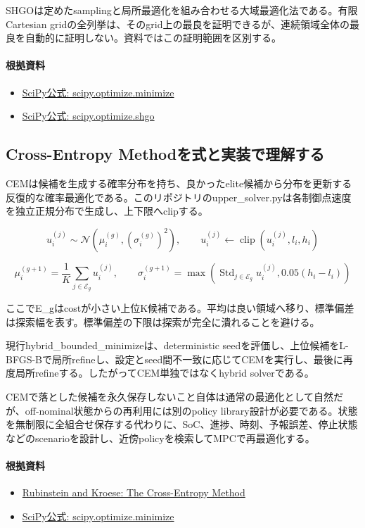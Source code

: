 \documentclass[a4paper,11pt]{article}
\begin{document}
SHGOは定めたsamplingと局所最適化を組み合わせる大域最適化法である。有限Cartesian gridの全列挙は、そのgrid上の最良を証明できるが、連続領域全体の最良を自動的に証明しない。資料ではこの証明範囲を区別する。

\paragraph{根拠資料}
\begin{itemize}[leftmargin=1.6em]
\item \href{https://docs.scipy.org/doc/scipy/reference/generated/scipy.optimize.minimize.html}{SciPy公式: scipy.optimize.minimize}
\item \href{https://docs.scipy.org/doc/scipy/reference/generated/scipy.optimize.shgo.html}{SciPy公式: scipy.optimize.shgo}
\end{itemize}

\subsection{Cross-Entropy Methodを式と実装で理解する}
CEMは候補を生成する確率分布を持ち、良かったelite候補から分布を更新する反復的な確率最適化である。このリポジトリのupper\_solver.pyは各制御点速度を独立正規分布で生成し、上下限へclipする。


\[
u_i^{(j)} \sim \mathcal{N}(\mu_i^{(g)},(\sigma_i^{(g)})^2),\qquad u_i^{(j)}\leftarrow\operatorname{clip}(u_i^{(j)},l_i,h_i)
\]

\[
\mu_i^{(g+1)}=\frac{1}{K}\sum_{j\in\mathcal{E}_g}u_i^{(j)},\qquad \sigma_i^{(g+1)}=\max\left(\operatorname{Std}_{j\in\mathcal{E}_g}u_i^{(j)},0.05(h_i-l_i)\right)
\]

ここでE\_gはcostが小さい上位K候補である。平均は良い領域へ移り、標準偏差は探索幅を表す。標準偏差の下限は探索が完全に潰れることを避ける。


現行hybrid\_bounded\_minimizeは、deterministic seedを評価し、上位候補をL-BFGS-Bで局所refineし、設定とseed間不一致に応じてCEMを実行し、最後に再度局所refineする。したがってCEM単独ではなくhybrid solverである。


CEMで落とした候補を永久保存しないこと自体は通常の最適化として自然だが、off-nominal状態からの再利用には別のpolicy library設計が必要である。状態を無制限に全組合せ保存する代わりに、SoC、進捗、時刻、予報誤差、停止状態などのscenarioを設計し、近傍policyを検索してMPCで再最適化する。

\paragraph{根拠資料}
\begin{itemize}[leftmargin=1.6em]
\item \href{https://link.springer.com/book/10.1007/978-1-4757-4321-0}{Rubinstein and Kroese: The Cross-Entropy Method}
\item \href{https://docs.scipy.org/doc/scipy/reference/generated/scipy.optimize.minimize.html}{SciPy公式: scipy.optimize.minimize}
\end{itemize}
\end{document}
